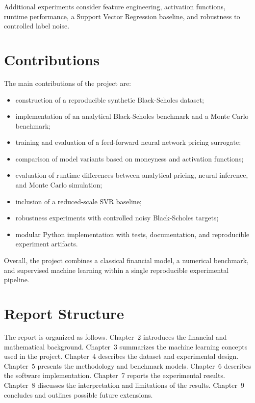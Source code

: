 Additional experiments consider feature engineering, activation functions, runtime performance, a Support Vector Regression baseline, and robustness to controlled label noise.

\section{Contributions}

The main contributions of the project are:

\begin{itemize}
    \item construction of a reproducible synthetic Black-Scholes dataset;
    \item implementation of an analytical Black-Scholes benchmark and a Monte Carlo benchmark;
    \item training and evaluation of a feed-forward neural network pricing surrogate;
    \item comparison of model variants based on moneyness and activation functions;
    \item evaluation of runtime differences between analytical pricing, neural inference, and Monte Carlo simulation;
    \item inclusion of a reduced-scale SVR baseline;
    \item robustness experiments with controlled noisy Black-Scholes targets;
    \item modular Python implementation with tests, documentation, and reproducible experiment artifacts.
\end{itemize}

Overall, the project combines a classical financial model, a numerical benchmark, and supervised machine learning within a single reproducible experimental pipeline.

\section{Report Structure}

The report is organized as follows.
Chapter~2 introduces the financial and mathematical background.
Chapter~3 summarizes the machine learning concepts used in the project.
Chapter~4 describes the dataset and experimental design.
Chapter~5 presents the methodology and benchmark models.
Chapter~6 describes the software implementation.
Chapter~7 reports the experimental results.
Chapter~8 discusses the interpretation and limitations of the results.
Chapter~9 concludes and outlines possible future extensions.
